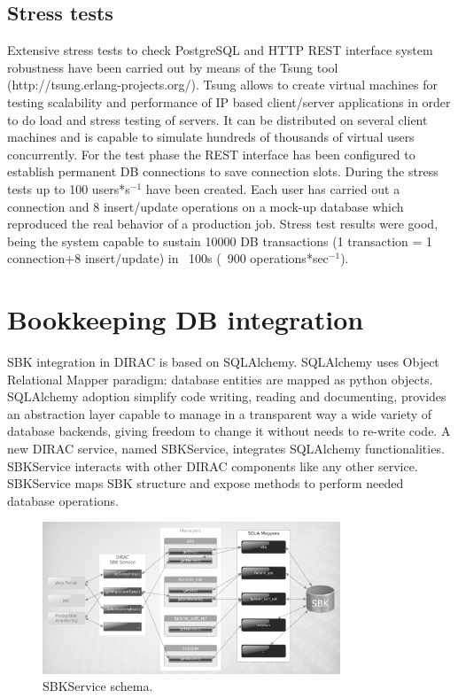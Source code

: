 \documentclass[journal]{IEEEtran}
\begin{document}
\subsection{Stress tests}
Extensive stress tests to check PostgreSQL and HTTP REST interface system robustness have been carried out by means of the Tsung tool (http://tsung.erlang-projects.org/). Tsung allows to create virtual machines for testing scalability and performance of IP based client/server applications in order to do load and stress testing of servers. It can be distributed on several client machines and is capable to simulate hundreds of thousands of virtual users concurrently. For the test phase the REST interface has been configured to establish permanent DB connections to save connection slots. During the stress tests up to 100 users*s$^{-1}$ have been created. Each user has carried out a connection and 8 insert/update operations on a mock-up database which reproduced the real behavior of a production job. Stress test results were good, being the system capable to sustain 10000 DB transactions (1 transaction = 1 connection+8 insert/update) in ~100s (~900 operations*sec$^{-1}$).

\section{Bookkeeping DB integration}
\label{sec:db}

SBK integration in DIRAC is based on SQLAlchemy. SQLAlchemy uses Object Relational Mapper paradigm: database entities are mapped as python objects. SQLAlchemy adoption simplify code writing, reading and documenting, provides an abstraction layer capable to manage in a transparent way a wide variety of database backends, giving freedom to change it without needs to re-write code.
A new DIRAC service, named SBKService, integrates SQLAlchemy functionalities. SBKService interacts with other DIRAC components like any other service. SBKService maps SBK structure and expose methods to perform needed database operations.

\begin{figure}[!h]
\centering
\includegraphics[width=3.5in]{SBKService.eps}
\caption{SBKService schema.}
\label{fig:SBKService}
\end{figure}
\end{document}
